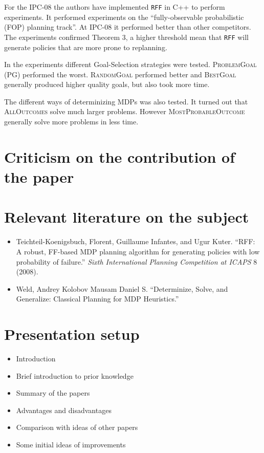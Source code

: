 \documentclass[runningheads,a4paper]{llncs}
\begin{document}
For the IPC-08 the authors have implemented \texttt{RFF} in C++ to perform
experiments. It performed experiments on the ``fully-observable probabilistic
(FOP) planning track''. At IPC-08 it performed better than other competitors.
The experiments confirmed Theorem 3, a higher threshold mean that \texttt{RFF}
will generate policies that are more prone to replanning.

In the experiments different Goal-Selection strategies were tested.
\textsc{ProblemGoal} (PG) performed the worst. \textsc{RandomGoal} performed
better and \textsc{BestGoal} generally produced higher quality goals, but also
took more time.

The different ways of determinizing MDPs was also tested. It turned out that
\textsc{AllOutcomes} solve much larger problems. However
\textsc{MostProbableOutcome} generally solve more problems in less time.


\section{Criticism on the contribution of the paper}

\section{Relevant literature on the subject}

\begin{itemize}
	\item Teichteil-Koenigsbuch, Florent, Guillaume Infantes, and Ugur Kuter. ``RFF: A robust, FF-based MDP planning algorithm for generating policies with low probability of failure.'' \emph{Sixth International Planning Competition at ICAPS} 8 (2008).
	\item Weld, Andrey Kolobov Mausam Daniel S. ``Determinize, Solve, and Generalize: Classical Planning for MDP Heuristics.''
\end{itemize}


\section{Presentation setup}

\begin{itemize}
	\item Introduction 
	\item Brief introduction to prior knowledge
	\item Summary of the papers
		\item Advantages and disadvantages
	\item Comparison with ideas of other papers
	\item Some initial ideas of improvements
\end{itemize}
\end{document}
